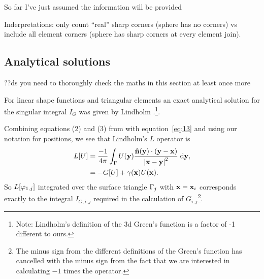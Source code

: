 So far I've just assumed the information will be provided

Inderpretations: only count ``real'' sharp corners (\ie sphere has no corners) vs include all element corners (\ie sphere has sharp corners at every element join).


\subsection{Analytical solutions}

??ds you need to thoroughly check the maths in this section at least once more

For linear shape functions and triangular elements an exact analytical solution for the singular integral $I_G$ was given by Lindholm \cite[App. B]{Lindholm1984}.\footnote{Note: Lindholm's definition of the 3d Green's function is a factor of -1 different to ours.}.

Combining equations (2) and (3) from \cite{Lindholm1984} with equation~\cref{eq:13} and using our notation for positions, we see that Lindholm's $L$ operator is
\begin{equation}
  \begin{aligned}
    L[U] &= \frac{-1}{4 \pi}\int_{\Gamma} U(\mathbf{y}) \frac{\mathbf{\hat{n}}(\mathbf{y}) \cdot (\mathbf{y} -
      \mathbf{x})}{\left|{\mathbf{x} - \mathbf{y}} \right|^2}
    {\; \text{d}}\mathbf{y}, \\
    &= -G[U] + \gamma(\mathbf{x}) U(\mathbf{x}).
  \end{aligned}
\end{equation}
So $L[\varphi_{1,{j}}]$ integrated over the surface triangle ${\Gamma}_{j}$ with $\mathbf{x} = \mathbf{x}_{i}$ corresponds exactly to the integral $I_{G,i,j}$ required in the calculation of $G_{i,j}$\footnote{The minus sign from the different definitions of the Green's function has cancelled with the minus sign from the fact that we are interested in calculating $-1$ times the operator.}.

